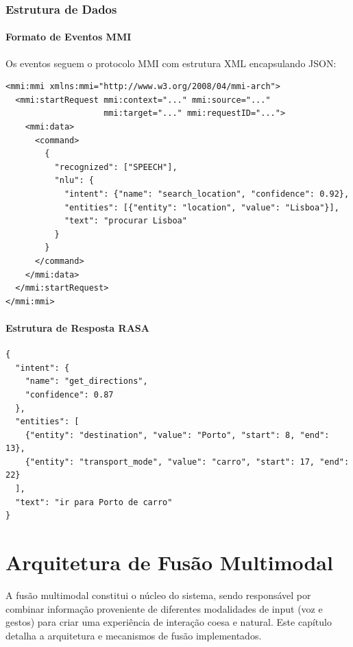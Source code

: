 \subsection{Estrutura de Dados}

\subsubsection{Formato de Eventos MMI}

Os eventos seguem o protocolo MMI com estrutura XML encapsulando JSON:

\begin{verbatim}
<mmi:mmi xmlns:mmi="http://www.w3.org/2008/04/mmi-arch">
  <mmi:startRequest mmi:context="..." mmi:source="..."
                    mmi:target="..." mmi:requestID="...">
    <mmi:data>
      <command>
        {
          "recognized": ["SPEECH"],
          "nlu": {
            "intent": {"name": "search_location", "confidence": 0.92},
            "entities": [{"entity": "location", "value": "Lisboa"}],
            "text": "procurar Lisboa"
          }
        }
      </command>
    </mmi:data>
  </mmi:startRequest>
</mmi:mmi>
\end{verbatim}

\subsubsection{Estrutura de Resposta RASA}

\begin{verbatim}
{
  "intent": {
    "name": "get_directions",
    "confidence": 0.87
  },
  "entities": [
    {"entity": "destination", "value": "Porto", "start": 8, "end": 13},
    {"entity": "transport_mode", "value": "carro", "start": 17, "end": 22}
  ],
  "text": "ir para Porto de carro"
}
\end{verbatim}



\chapter{Arquitetura de Fusão Multimodal}

A fusão multimodal constitui o núcleo do sistema, sendo responsável por combinar informação proveniente de diferentes modalidades de input (voz e gestos) para criar uma experiência de interação coesa e natural. Este capítulo detalha a arquitetura e mecanismos de fusão implementados.

